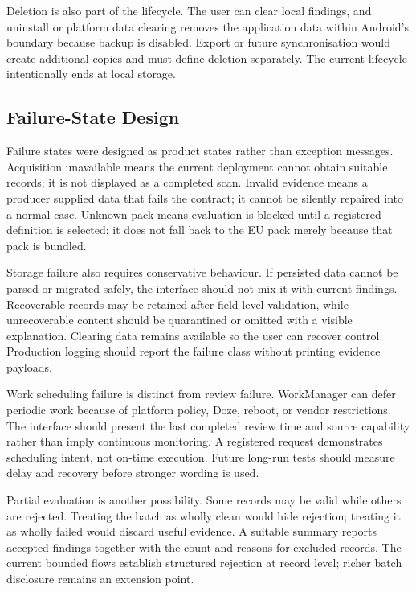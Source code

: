 Deletion is also part of the lifecycle. The user can clear local findings, and uninstall or platform data clearing removes the application data within Android's boundary because backup is disabled. Export or future synchronisation would create additional copies and must define deletion separately. The current lifecycle intentionally ends at local storage.

\subsection{Failure-State Design}

Failure states were designed as product states rather than exception messages. Acquisition unavailable means the current deployment cannot obtain suitable records; it is not displayed as a completed scan. Invalid evidence means a producer supplied data that fails the contract; it cannot be silently repaired into a normal case. Unknown pack means evaluation is blocked until a registered definition is selected; it does not fall back to the EU pack merely because that pack is bundled.

Storage failure also requires conservative behaviour. If persisted data cannot be parsed or migrated safely, the interface should not mix it with current findings. Recoverable records may be retained after field-level validation, while unrecoverable content should be quarantined or omitted with a visible explanation. Clearing data remains available so the user can recover control. Production logging should report the failure class without printing evidence payloads.

Work scheduling failure is distinct from review failure. WorkManager can defer periodic work because of platform policy, Doze, reboot, or vendor restrictions. The interface should present the last completed review time and source capability rather than imply continuous monitoring. A registered request demonstrates scheduling intent, not on-time execution. Future long-run tests should measure delay and recovery before stronger wording is used.

Partial evaluation is another possibility. Some records may be valid while others are rejected. Treating the batch as wholly clean would hide rejection; treating it as wholly failed would discard useful evidence. A suitable summary reports accepted findings together with the count and reasons for excluded records. The current bounded flows establish structured rejection at record level; richer batch disclosure remains an extension point.


